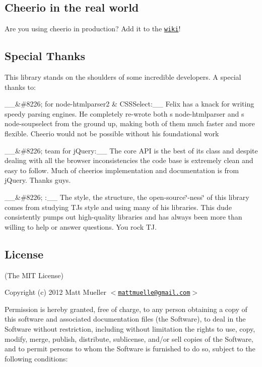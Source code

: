 \subsection*{Cheerio in the real world}

Are you using cheerio in production? Add it to the \href{https://github.com/cheeriojs/cheerio/wiki/Cheerio-in-Production}{\tt wiki}!

\subsection*{Special Thanks}

This library stands on the shoulders of some incredible developers. A special thanks to\+:

\+\_\+\+\_\+\&\#8226;  for node-\/htmlparser2 \& C\+S\+S\+Select\+:\+\_\+\+\_\+ Felix has a knack for writing speedy parsing engines. He completely re-\/wrote both \textquotesingle{}s {\ttfamily node-\/htmlparser} and \textquotesingle{}s {\ttfamily node-\/soupselect} from the ground up, making both of them much faster and more flexible. Cheerio would not be possible without his foundational work

\+\_\+\+\_\+\&\#8226;  team for j\+Query\+:\+\_\+\+\_\+ The core A\+PI is the best of its class and despite dealing with all the browser inconsistencies the code base is extremely clean and easy to follow. Much of cheerio\textquotesingle{}s implementation and documentation is from j\+Query. Thanks guys.

\+\_\+\+\_\+\&\#8226; \+:\+\_\+\+\_\+ The style, the structure, the open-\/source\char`\"{}-\/ness\char`\"{} of this library comes from studying TJ\textquotesingle{}s style and using many of his libraries. This dude consistently pumps out high-\/quality libraries and has always been more than willing to help or answer questions. You rock TJ.

\subsection*{License}

(The M\+IT License)

Copyright (c) 2012 Matt Mueller $<$\href{mailto:mattmuelle@gmail.com}{\tt mattmuelle@gmail.\+com}$>$

Permission is hereby granted, free of charge, to any person obtaining a copy of this software and associated documentation files (the \textquotesingle{}Software\textquotesingle{}), to deal in the Software without restriction, including without limitation the rights to use, copy, modify, merge, publish, distribute, sublicense, and/or sell copies of the Software, and to permit persons to whom the Software is furnished to do so, subject to the following conditions\+:

